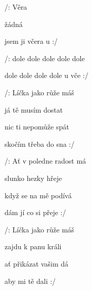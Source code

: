 

\zs
/:  Věra 

 žádná 

 jsem ji včera 
 u  :/
\ks

\zr
/:  dole dole dole  dole dole

 dole dole dole dole u vče :/
\kr

\zs
/: Líčka jako růže máš

já tě musím dostat

nic ti nepomůže spát

skočím třeba do sna :/
\ks

\zr  \kr

\zs
/: Ať v poledne radost má

slunko hezky hřeje

když se na mě podívá

dám jí co si přeje :/
\ks

\zr  \kr

\zs
/: Líčka jako růže máš

zajdu k panu králi

ať přikázat vašim dá

aby mi tě dali :/
\ks

\zr  \kr

\kp

























